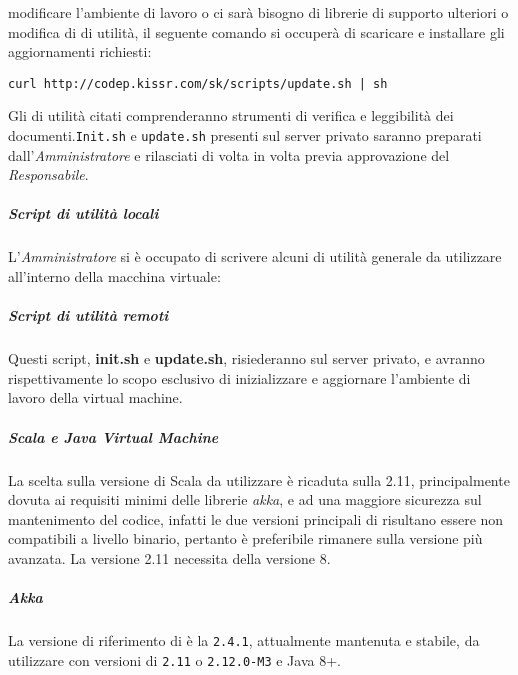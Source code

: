 \documentclass{scalatekids-article}
\begin{document}
modificare l'ambiente di lavoro o ci sarà bisogno di librerie di supporto
ulteriori o modifica di  di utilità, il seguente comando si
occuperà di scaricare e installare gli aggiornamenti richiesti:
\begin{center}
  \verb=curl http://codep.kissr.com/sk/scripts/update.sh | sh=
\end{center}
Gli  di utilità citati comprenderanno strumenti di verifica e
leggibilità dei documenti.\verb=Init.sh= e \verb=update.sh=
presenti sul server privato saranno preparati dall'\textit{Amministratore} e
rilasciati di volta in volta previa approvazione del \textit{Responsabile}.
\subparagraph{Script di utilità locali}
\label{sec:script}
L'\textit{Amministratore} si è occupato di scrivere alcuni  di utilità
generale da utilizzare all'interno della macchina virtuale:
\subparagraph{Script di utilità remoti}
Questi script, \textbf{init.sh} e \textbf{update.sh}, risiederanno sul server
privato, e avranno rispettivamente lo scopo esclusivo di inizializzare e
aggiornare l'ambiente di lavoro della virtual machine.
\subparagraph{Scala e Java Virtual Machine}
La scelta sulla versione di Scala da utilizzare è ricaduta sulla 
2.11, principalmente dovuta ai requisiti minimi delle librerie \textit{akka}, e
ad una maggiore sicurezza sul mantenimento del codice, infatti le due versioni
principali di  risultano essere non compatibili a livello binario,
pertanto è preferibile rimanere sulla versione più avanzata. La versione 2.11
necessita della  versione 8.
\subparagraph{Akka}
La versione di riferimento di  è la \verb=2.4.1=, attualmente
mantenuta e stabile, da utilizzare con versioni di  \verb=2.11= o
\verb=2.12.0-M3= e Java 8+.
\end{document}
